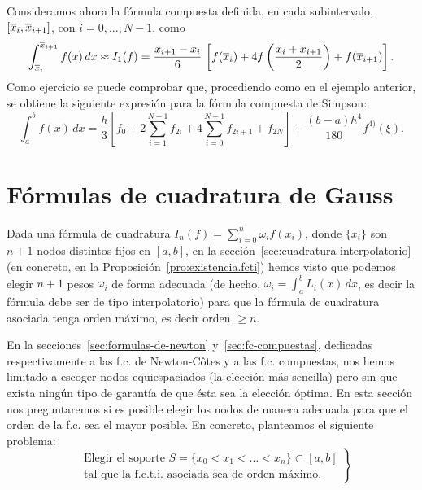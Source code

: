 \begin{example} 
  Consideramos ahora la fórmula compuesta definida, en cada
  subintervalo, $[\overline x_{i},\overline x_{i+1}]$, con $i=0,...,N-1$, como
   \begin{equation*}
    \int_{\overline x_{i}}^{\overline x_{i+1}} f(x)\, dx \approx I_1(f)=
    \frac{\overline x_{i+1}-\overline x_{i}}{6} \, \left[f(\overline x_i) + 
      4f\left(\frac{\overline x_{i}+\overline x_{i+1}}{2}\right)+f(\overline x_{i+1})\right].
  \end{equation*}
  Como ejercicio se puede comprobar que, procediendo como en el
  ejemplo anterior, se obtiene la siguiente expresión para la fórmula
  compuesta de Simpson:
  \begin{equation*}
    \int_a^b f(x)\,dx 
    = \frac{h}{3} \left[
      f_0 
      + 2\sum_{i=1}^{N-1} f_{2i} 
      + 4\sum_{i=0}^{N-1} f_{2i+1} 
      + f_{2N} \right]
    + \frac{(b-a)h^4}{180} f^{4)}(\xi).
  \end{equation*}  
\end{example}

\section{Fórmulas de cuadratura de Gauss}
\label{sec:fc-Gauss}
Dada una fórmula de cuadratura $I_n(f)=\sum_{i=0}^n \omega_i f(x_i)$,
donde $\{x_i\}$ son $n+1$ nodos distintos fijos en
$[a,b]$, en la sección~\ref{sec:cuadratura-interpolatorio} (en
concreto, en la Proposición~\ref{pro:existencia.fcti}) hemos visto que
podemos elegir $n+1$ pesos $\omega_i$ de forma adecuada (de hecho,
$\omega_i=\int_a^b L_i(x)\, dx$, es decir la fórmula debe ser de tipo
interpolatorio) para que la fórmula de cuadratura asociada tenga orden
máximo, es decir orden $\ge n$.

En la secciones~\ref{sec:formulas-de-newton}
y~\ref{sec:fc-compuestas}, dedicadas respectivamente a las f.c. de
Newton-Côtes y a las f.c. compuestas, nos hemos limitado a escoger
nodos equiespaciados (la elección más sencilla) pero sin que exista
ningún tipo de garantía de que ésta sea la elección óptima. En esta
sección nos preguntaremos si es posible elegir los nodos de manera
adecuada para que el orden de la f.c. sea el mayor posible. En
concreto, planteamos el siguiente problema:
\begin{equation}
\label{eq:pb.fc.Gauss}
\tag{P}
\left.
  \begin{aligned}
    &\text{Elegir el soporte $S=\{x_0<x_1<...<x_n\}\subset [a,b]$}
    \\
    &\text{tal que la f.c.t.i. asociada sea de orden máximo.}
  \end{aligned}
\right\}
\end{equation}

